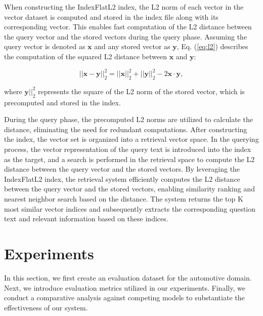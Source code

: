 \documentclass[mathematics,article,submit,moreauthors]{Definitions/mdpi}
\newcommand{\1}[1]{\mathds{1}\left[#1\right]}
\newcommand{\eqnref}[1]{Eq. (\ref{#1})}
\begin{document}
When constructing the IndexFlatL2 index, the L2 norm of each vector in the vector dataset is computed and stored in the index file along with its corresponding vector. This enables fast computation of the L2 distance between the query vector and the stored vectors during the query phase. 
Assuming the query vector is denoted as $\mathbf{x}$ and any stored vector as $\mathbf{y}$, \eqnref{eq:l2} describes the computation of the squared L2 distance between $\mathbf{x}$ and $\mathbf{y}$:
\begin{linenomath}
	\begin{equation}\label{eq:l2}
		||\mathbf{x}-\mathbf{y}||_2^2 = ||\mathbf{x}||_2^2 + ||\mathbf{y}||_2^2 - 2\mathbf{x}\cdot \mathbf{y}, 
	\end{equation}
\end{linenomath}
where $\mathbf{y}||_2^2$ represents the square of the L2 norm of the stored vector, which is precomputed and stored in the index.

During the query phase, the precomputed L2 norms are utilized to calculate the distance, eliminating the need for redundant computations. After constructing the index, the vector set is organized into a retrieval vector space. In the querying process, the vector representation of the query text is introduced into the index as the target, and a search is performed in the retrieval space to compute the L2 distance between the query vector and the stored vectors. By leveraging the IndexFlatL2 index, the retrieval system efficiently computes the L2 distance between the query vector and the stored vectors, enabling similarity ranking and nearest neighbor search based on the distance. The system returns the top K most similar vector indices and subsequently extracts the corresponding question text and relevant information based on these indices.

\section{Experiments}
In this section, we first create an evaluation dataset for the automotive domain. Next, we introduce evaluation metrics utilized in our experiments. Finally, we conduct a comparative analysis against competing models to substantiate the effectiveness of our system.
\end{document}
